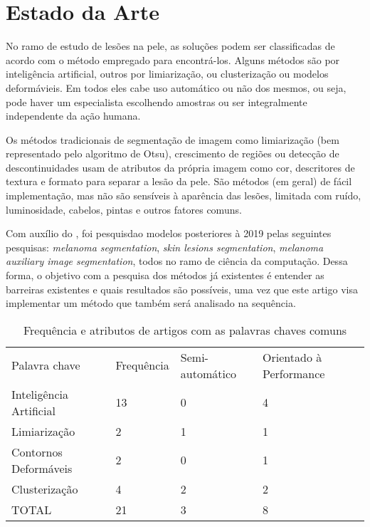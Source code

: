 \section{Estado da Arte}

No ramo de estudo de lesões na pele, as soluções podem ser classificadas de acordo com o método empregado para encontrá-los. Alguns métodos são por inteligência artificial, outros por limiarização, ou clusterização ou modelos deformávieis. Em todos eles cabe uso automático ou não dos mesmos, ou seja, pode haver um especialista escolhendo amostras ou ser integralmente independente da ação humana.

Os métodos tradicionais de segmentação de imagem como limiarização (bem representado pelo algoritmo de Otsu\cite{otsu1979threshold}), crescimento de regiões ou detecção de descontinuidades usam de atributos da própria imagem como cor, descritores de textura e formato para separar a lesão da pele. São métodos (em geral) de fácil implementação, mas não são sensíveis à aparência das lesões, limitada com ruído, luminosidade, cabelos, pintas e outros fatores comuns.

Com auxílio do \cite{arxiv}, foi pesquisdao modelos posteriores à 2019 pelas seguintes pesquisas: \textit{melanoma segmentation}, \textit{skin lesions segmentation}, \textit{melanoma auxiliary image segmentation}, todos no ramo de ciência da computação. Dessa forma, o objetivo com a pesquisa dos métodos já existentes é entender as barreiras existentes e quais resultados são possíveis, uma vez que este artigo visa implementar um método que também será analisado na sequência.

\begin{table}[]
  \begin{tabular}{llll}
    Palavra chave           & Frequência & Semi-automático & Orientado à Performance \\
    Inteligência Artificial & 13         & 0               & 4                       \\
    Limiarização            & 2          & 1               & 1                       \\
    Contornos Deformáveis   & 2          & 0               & 1                       \\
    Clusterização           & 4          & 2               & 2                       \\
    TOTAL                   & 21         & 3               & 8
  \end{tabular}
  \caption{Frequência e atributos de artigos com as palavras chaves comuns}
  \label{table:state-of-art}
\end{table}

